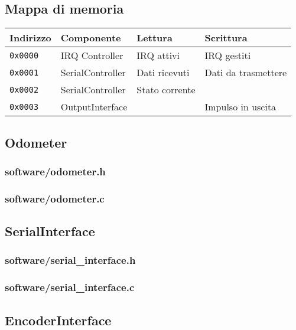 \documentclass [11pt,a4paper,oneside]{article}
\begin{document}
\subsection{Mappa di memoria}
\begin{tabular}{|l|l|l|l|}
\hline
Indirizzo & Componente & Lettura & Scrittura \\
\hline
\texttt{0x0000} & IRQ Controller & IRQ attivi & IRQ gestiti \\
\hline
\texttt{0x0001} & SerialController & Dati ricevuti & Dati da trasmettere \\
\hline
\texttt{0x0002} & SerialController & Stato corrente & \\
\hline
\texttt{0x0003} & OutputInterface & & Impulso in uscita \\
\hline
\end{tabular}



\subsection{Odometer}
\subsubsection{software/odometer.h}

\subsubsection{software/odometer.c}


\subsection{SerialInterface}
\subsubsection{software/serial\_interface.h}

\subsubsection{software/serial\_interface.c}


\subsection{EncoderInterface}
\end{document}
